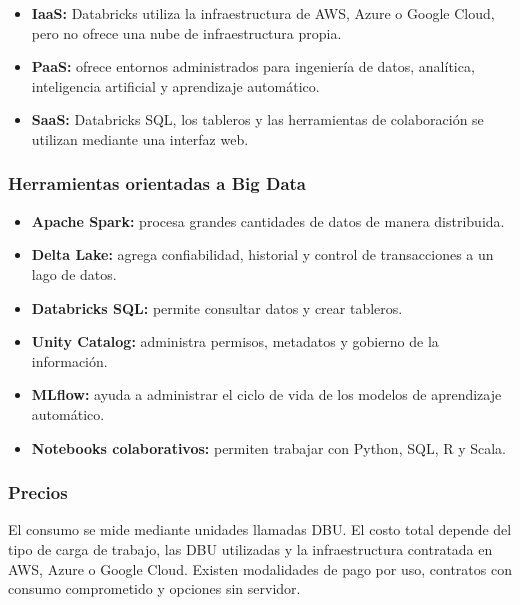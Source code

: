 \begin{itemize}
    \item \textbf{IaaS:} Databricks utiliza la infraestructura de AWS, Azure o
    Google Cloud, pero no ofrece una nube de infraestructura propia.
    
    \item \textbf{PaaS:} ofrece entornos administrados para ingeniería de datos,
    analítica, inteligencia artificial y aprendizaje automático.
    
    \item \textbf{SaaS:} Databricks SQL, los tableros y las herramientas de
    colaboración se utilizan mediante una interfaz web.
\end{itemize}

\subsubsection*{Herramientas orientadas a Big Data}

\begin{itemize}
    \item \textbf{Apache Spark:} procesa grandes cantidades de datos de manera
    distribuida.
    
    \item \textbf{Delta Lake:} agrega confiabilidad, historial y control de
    transacciones a un lago de datos.
    
    \item \textbf{Databricks SQL:} permite consultar datos y crear tableros.
    
    \item \textbf{Unity Catalog:} administra permisos, metadatos y gobierno de
    la información.
    
    \item \textbf{MLflow:} ayuda a administrar el ciclo de vida de los modelos
    de aprendizaje automático.
    
    \item \textbf{Notebooks colaborativos:} permiten trabajar con Python, SQL,
    R y Scala.
\end{itemize}

\subsubsection*{Precios}

El consumo se mide mediante unidades llamadas DBU. El costo total depende del
tipo de carga de trabajo, las DBU utilizadas y la infraestructura contratada
en AWS, Azure o Google Cloud. Existen modalidades de pago por uso, contratos
con consumo comprometido y opciones sin servidor.

